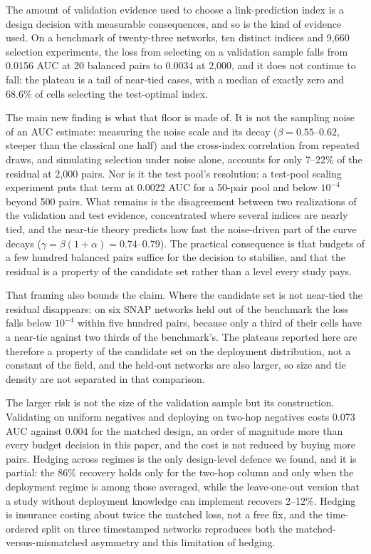\documentclass{comjnl}
\begin{document}
The amount of validation evidence used to choose a link-prediction index is a design decision with measurable consequences, and so is the kind of evidence used. On a benchmark of twenty-three networks, ten distinct indices and 9{,}660 selection experiments, the loss from selecting on a validation sample falls from 0.0156 AUC at 20 balanced pairs to 0.0034 at 2{,}000, and it does not continue to fall: the plateau is a tail of near-tied cases, with a median of exactly zero and 68.6\% of cells selecting the test-optimal index.

The main new finding is what that floor is made of. It is not the sampling noise of an AUC estimate: measuring the noise scale and its decay ($\beta=0.55$--$0.62$, steeper than the classical one half) and the cross-index correlation from repeated draws, and simulating selection under noise alone, accounts for only 7--22\% of the residual at 2{,}000 pairs. Nor is it the test pool's resolution: a test-pool scaling experiment puts that term at 0.0022 AUC for a 50-pair pool and below $10^{-4}$ beyond 500 pairs. What remains is the disagreement between two realizations of the validation and test evidence, concentrated where several indices are nearly tied, and the near-tie theory predicts how fast the noise-driven part of the curve decays ($\gamma=\beta(1+\alpha)=0.74$--$0.79$). The practical consequence is that budgets of a few hundred balanced pairs suffice for the decision to stabilise, and that the residual is a property of the candidate set rather than a level every study pays.

That framing also bounds the claim. Where the candidate set is not near-tied the residual disappears: on six SNAP networks held out of the benchmark the loss falls below $10^{-4}$ within five hundred pairs, because only a third of their cells have a near-tie against two thirds of the benchmark's. The plateaus reported here are therefore a property of the candidate set on the deployment distribution, not a constant of the field, and the held-out networks are also larger, so size and tie density are not separated in that comparison.

The larger risk is not the size of the validation sample but its construction. Validating on uniform negatives and deploying on two-hop negatives costs 0.073 AUC against 0.004 for the matched design, an order of magnitude more than every budget decision in this paper, and the cost is not reduced by buying more pairs. Hedging across regimes is the only design-level defence we found, and it is partial: the 86\% recovery holds only for the two-hop column and only when the deployment regime is among those averaged, while the leave-one-out version that a study without deployment knowledge can implement recovers 2--12\%. Hedging is insurance costing about twice the matched loss, not a free fix, and the time-ordered split on three timestamped networks reproduces both the matched-versus-mismatched asymmetry and this limitation of hedging.
\end{document}
